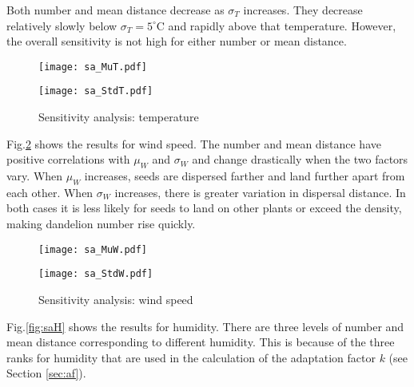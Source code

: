 \documentclass[12pt]{article}
\begin{document}
			Both number and mean distance decrease as $\sigma_T$ increases.  They decrease relatively slowly below $\sigma_T = 5^\circ$C and rapidly above that temperature.  However, the overall sensitivity is not high for either number or mean distance.
			
			\begin{figure}[htbp]
				\centering
				\begin{minipage}{0.04\textwidth}\end{minipage}
				\begin{minipage}{0.46\textwidth}
					\texttt{[image: sa\_MuT.pdf]}
				\end{minipage}
				\begin{minipage}{0.46\textwidth}
					\texttt{[image: sa\_StdT.pdf]}
				\end{minipage}
				\begin{minipage}{0.04\textwidth}\end{minipage}
				\caption{Sensitivity analysis: temperature}
				\label{fig:saT}
			\end{figure}
			
			Fig.\ref{fig:saW} shows the results for wind speed.  The number and mean distance have positive correlations with $\mu_W$ and $\sigma_W$ and change drastically when the two factors vary.  When $\mu_W$ increases, seeds are dispersed farther and land further apart from each other.  When $\sigma_W$ increases, there is greater variation in dispersal distance.  In both cases it is less likely for seeds to land on other plants or exceed the density, making dandelion number rise quickly.
			
			\begin{figure}[htbp]
				\centering
				\begin{minipage}{0.04\textwidth}\end{minipage}
				\begin{minipage}{0.46\textwidth}
					\texttt{[image: sa\_MuW.pdf]}
				\end{minipage}
				\begin{minipage}{0.46\textwidth}
					\texttt{[image: sa\_StdW.pdf]}
				\end{minipage}
				\caption{Sensitivity analysis: wind speed}
				\label{fig:saW}
			\end{figure}
			
			Fig.\ref{fig:saH} shows the results for humidity.  There are three levels of number and mean distance corresponding to different humidity.  This is because of the three ranks for humidity that are used in the calculation of the adaptation factor $k$ (see Section \ref{sec:af}).
			
\end{document}
